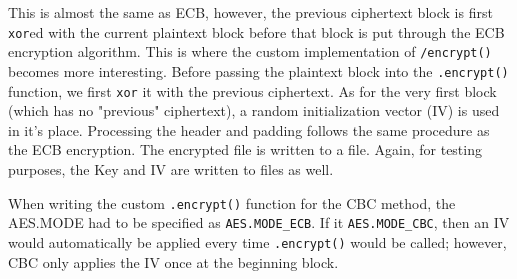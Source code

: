 \documentclass[11pt]{article}
\begin{document}
This is almost the same as ECB, however, the previous ciphertext block is first \verb|xor|ed with the current plaintext block before that block is put through the ECB encryption algorithm. This is where the custom implementation of \verb|/encrypt()| becomes more interesting. Before passing the plaintext block into the \verb|.encrypt()| function, we first \verb|xor| it with the previous ciphertext. As for the very first block (which has no "previous" ciphertext), a random initialization vector (IV) is used in it's place. Processing the header and padding follows the same procedure as the ECB encryption. The encrypted file is written to a file. Again, for testing purposes, the Key and IV are written to files as well.

When writing the custom \verb|.encrypt()| function for the CBC method, the AES.MODE had to be specified as \verb|AES.MODE_ECB|. If it \verb|AES.MODE_CBC|, then an IV would automatically be applied every time \verb|.encrypt()| would be called; however, CBC only applies the IV once at the beginning block.
\end{document}
